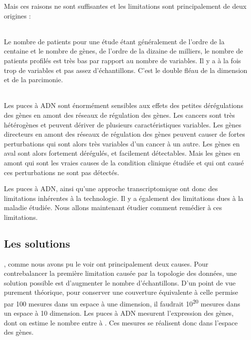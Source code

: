 			 Mais ces raisons ne sont suffisantes et les limitations sont principalement de deux origines :
			\begin{description}\label{def:limitations}
				\item [La topologie des données]   \hfill \\
					Le nombre de patients pour une étude étant généralement de l'ordre de la centaine et le nombre de gènes, de l'ordre de la dizaine de milliers, le nombre de patients profilés est très bas par rapport au nombre de variables.
					Il y a à la fois trop de variables et pas assez d'échantillons.
					C'est le double fléau de la dimension et de la parcimonie.
				\item [La biologie du cancer]      \hfill \\
					Les puces à \acs{ADN} sont énormément sensibles aux effets des petites dérégulations des gènes en amont des réseaux de régulation des gènes.
					Les cancers sont très hétérogènes et peuvent dériver de plusieurs caractéristiques variables.
					Les gènes directeurs en amont des réseaux de régulation des gènes peuvent causer de fortes perturbations qui sont alors très variables d'un cancer à un autre.
					Les gènes en aval sont alors fortement dérégulés, et facilement détectables.
					Mais les gènes en amont qui sont les vraies causes de la condition clinique étudiée et qui ont causé ces perturbations ne sont pas détectés.
			\end{description}

			Les puces à \acs{ADN}, ainsi qu'une approche transcriptomique ont donc des limitations inhérentes à la technologie.
			Il y a également des limitations dues à la maladie étudiée.
			Nous allons maintenant étudier comment remédier à ces limitations.

		\subsection{\textcolor{red!45!black}{Les solutions}}

			, comme nous avons pu le voir ont principalement deux causes.
			Pour contrebalancer la première limitation causée par la topologie des données, une solution possible est d'augmenter le nombre d'échantillons.
			D'un point de vue purement théorique, pour conserver une couverture équivalente à celle permise par 100 mesures dans un espace à une dimension, il faudrait 10\textsuperscript{20} mesures dans un espace à 10 dimension.
			Les puces à \acs{ADN} mesurent l'expression des gènes, dont on estime le nombre entre  à .
			Ces mesures se réalisent donc dans l'espace des gènes.

